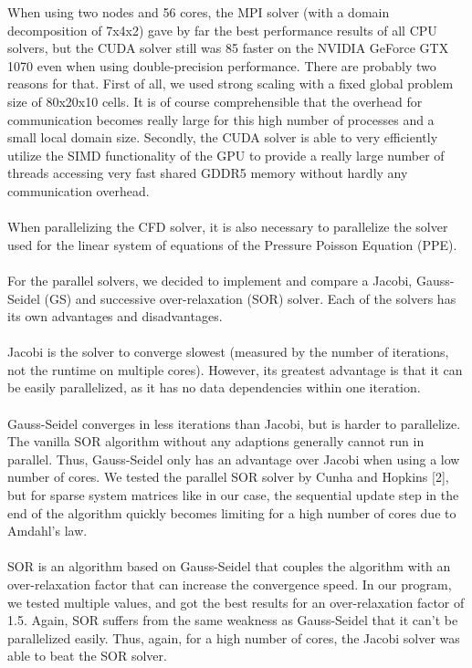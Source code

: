 \documentclass{article}%
\begin{document}
When using two nodes and 56 cores, the MPI solver (with a domain decomposition of 7x4x2) gave by far the best performance results of all CPU solvers, but the CUDA solver still was 85\text{\%} faster on the NVIDIA GeForce GTX 1070 even when using double-precision performance. There are probably two reasons for that. First of all, we used strong scaling with a fixed global problem size of 80x20x10 cells. It is of course comprehensible that the overhead for communication becomes really large for this high number of processes and a small local domain size. Secondly, the CUDA solver is able to very efficiently utilize the SIMD functionality of the GPU to provide a really large number of threads accessing very fast shared GDDR5 memory without hardly any communication overhead.\\
\\
When parallelizing the CFD solver, it is also necessary to parallelize the solver used for the linear system of equations of the Pressure Poisson Equation (PPE).\\
\\
For the parallel solvers, we decided to implement and compare a Jacobi, Gauss-Seidel (GS) and successive over-relaxation (SOR) solver. Each of the solvers has its own advantages and disadvantages.\\
\\
Jacobi is the solver to converge slowest (measured by the number of iterations, not the runtime on multiple cores). However, its greatest advantage is that it can be easily parallelized, as it has no data dependencies within one iteration.\\
\\
Gauss-Seidel converges in less iterations than Jacobi, but is harder to parallelize. The vanilla SOR algorithm without any adaptions generally cannot run in parallel. Thus, Gauss-Seidel only has an advantage over Jacobi when using a low number of cores. We tested the parallel SOR solver by Cunha and Hopkins [2], but for sparse system matrices like in our case, the sequential update step in the end of the algorithm quickly becomes limiting for a high number of cores due to Amdahl’s law.\\
\\
SOR is an algorithm based on Gauss-Seidel that couples the algorithm with an over-relaxation factor that can increase the convergence speed. In our program, we tested multiple values, and got the best results for an over-relaxation factor of 1.5. Again, SOR suffers from the same weakness as Gauss-Seidel that it can’t be parallelized easily. Thus, again, for a high number of cores, the Jacobi solver was able to beat the SOR solver.\\
\end{document}
